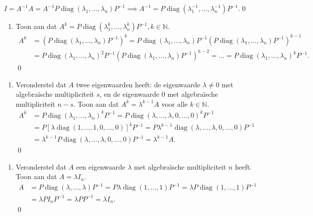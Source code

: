 \begin{oefening}[6.3.5]
\begin{enumerate}
        \(I 
        = A^{-1}A 
        = A^{-1}P \operatorname{diag}(\lambda_1, \dots, \lambda_n) P^{-1}
        \implies A^{-1} = P \operatorname{diag}(\lambda_1^{-1}, \dots, \lambda_n^{-1}) P^{-1}
        \).\qed
    \end{enumerate}
    \begin{enumerate}
        \item[(b)] Toon aan dat $A^k = P \operatorname{diag}(\lambda_1^k, \dots, \lambda_n^k)P^{-1}, k \in \mathbb{N}$.
        \begin{align*}
        A^k 
        &= \left( P \operatorname{diag}(\lambda_1, \dots, \lambda_n) P^{-1}\right)^k
        =  P \operatorname{diag}(\lambda_1, \dots, \lambda_n) P^{-1}\left( P \operatorname{diag}(\lambda_1, \dots, \lambda_n) P^{-1}\right)^{k-1}\\
        &=  P \operatorname{diag}(\lambda_1, \dots, \lambda_n)^2 P^{-1}\left( P \operatorname{diag}(\lambda_1, \dots, \lambda_n) P^{-1}\right)^{k-2}
        = \dots =  P \operatorname{diag}(\lambda_1, \dots, \lambda_n)^k P^{-1}.
        \end{align*}\qed
    \end{enumerate}
    \begin{enumerate}
        \item[(c)] Veronderstel dat $A$ twee eigenwaarden heeft: de eigenwaarde $\lambda \neq 0$ met algebraïsche multipliciteit $s$, en de eigenwaarde $0$ met algebraïsche multipliciteit $n - s$. Toon aan dat $A^k = \lambda^{k-1}A$ voor alle $k \in \mathbb{N}$.
        \begin{align*}
            A^k 
            &= P \operatorname{diag}(\lambda_1, \dots, \lambda_n)^k P^{-1}
            = P \operatorname{diag}(\lambda, \dots, \lambda,0, \dots, 0)^k P^{-1}\\
            &= P \left[\lambda\operatorname{diag}(1, \dots, 1,0, \dots, 0)\right]^k P^{-1}
            = P \lambda^{k-1}\operatorname{diag}(\lambda, \dots, \lambda,0, \dots, 0) P^{-1}\\
            &=\lambda^{k-1}P\operatorname{diag}(\lambda, \dots, \lambda,0, \dots, 0) P^{-1}
            = \lambda^{k-1}A.
        \end{align*}\qed
    \end{enumerate}
    \begin{enumerate}
        \item[(d)] Veronderstel dat $A$ een eigenwaarde $\lambda$ met algebraïsche multipliciteit $n$ heeft. Toon aan dat $A = \lambda I_n$.
        \begin{align*}
            A
            &= P\operatorname{diag}(\lambda, \dots, \lambda) P^{-1}
            = P\lambda\operatorname{diag}(1, \dots, 1) P^{-1}
            =\lambda P\operatorname{diag}(1, \dots, 1) P^{-1} \\
            &= \lambda P I_n P^{-1}
            = \lambda P P^{-1}
            = \lambda I_n.
        \end{align*} \qed
    \end{enumerate}
\end{oefening}

